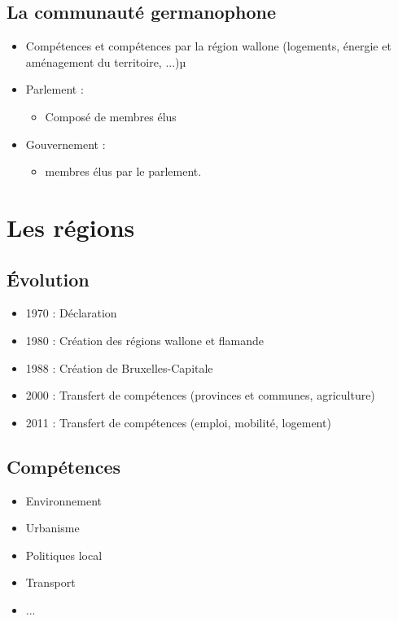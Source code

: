 \subsection{La communauté germanophone}
\begin{itemize}
	\item Compétences  et compétences  par la région wallone (logements, énergie et aménagement du territoire, ...)µ
	\item Parlement :
	\begin{itemize}
		\item Composé de  membres élus
	\end{itemize}
	\item Gouvernement :
	\begin{itemize}
		\item {} membres  élus par le parlement.
	\end{itemize}
\end{itemize}

\section{Les régions}

\subsection{Évolution}
\begin{itemize}
	\item 1970 : Déclaration
	\item 1980 : Création des régions wallone et flamande
	\item 1988 : Création de Bruxelles-Capitale
	\item 2000 : Transfert de compétences (provinces et communes, agriculture)
	\item 2011 : Transfert de compétences (emploi, mobilité, logement)
\end{itemize}

\subsection{Compétences}
\begin{itemize}
	\item Environnement
	\item Urbanisme
	\item Politiques local
	\item Transport
	\item ...
\end{itemize}

